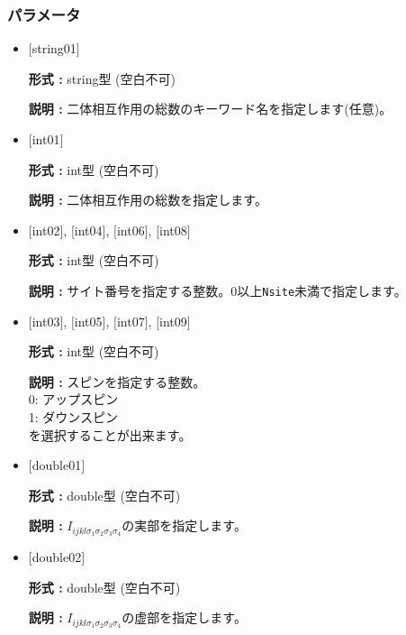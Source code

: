 \subsubsection{パラメータ}
 \begin{itemize}

   \item  $[$string01$]$
   
    {\bf 形式 :} string型 (空白不可)

   {\bf 説明 :} 二体相互作用の総数のキーワード名を指定します(任意)。

   \item  $[$int01$]$
   
    {\bf 形式 :} int型 (空白不可)

   {\bf 説明 :} 二体相互作用の総数を指定します。

  \item  $[$int02$]$, $[$int04$]$, $[$int06$]$, $[$int08$]$

 {\bf 形式 :} int型 (空白不可)

{\bf 説明 :} サイト番号を指定する整数。0以上\verb|Nsite|{未満}で指定します。
 
  \item  $[$int03$]$, $[$int05$]$, $[$int07$]$, $[$int09$]$

 {\bf 形式 :} int型 (空白不可)

{\bf 説明 :} スピンを指定する整数。\\
0: アップスピン\\
1: ダウンスピン\\
を選択することが出来ます。


 \item  $[$double01$]$
   
   {\bf 形式 :} double型 (空白不可)

  {\bf 説明 :}  $I_{ijkl\sigma_1\sigma_2\sigma_3\sigma_4}$の実部を指定します。

 \item  $[$double02$]$
   
   {\bf 形式 :} double型 (空白不可)

  {\bf 説明 :}  $I_{ijkl\sigma_1\sigma_2\sigma_3\sigma_4}$の虚部を指定します。
\end{itemize}


